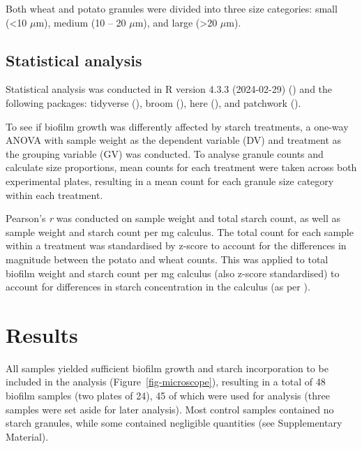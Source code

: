 \documentclass[
  b5paper,
]{book}
\begin{document}
Both wheat and potato granules were divided into three size categories:
small (\textless10 \(\mu\)m), medium (10 -- 20 \(\mu\)m), and large
(\textgreater20 \(\mu\)m).

\subsection{Statistical analysis}\label{statistical-analysis}

Statistical analysis was conducted in R version 4.3.3 (2024-02-29)
() and the following packages:
tidyverse (), broom
(), here
(), and patchwork
().

To see if biofilm growth was differently affected by starch treatments,
a one-way ANOVA with sample weight as the dependent variable (DV) and
treatment as the grouping variable (GV) was conducted. To analyse
granule counts and calculate size proportions, mean counts for each
treatment were taken across both experimental plates, resulting in a
mean count for each granule size category within each treatment.

Pearson's \emph{r} was conducted on sample weight and total starch
count, as well as sample weight and starch count per mg calculus. The
total count for each sample within a treatment was standardised by
z-score to account for the differences in magnitude between the potato
and wheat counts. This was applied to total biofilm weight and starch
count per mg calculus (also z-score standardised) to account for
differences in starch concentration in the calculus (as per
).

\section{Results}\label{results-1}

All samples yielded sufficient biofilm growth and starch incorporation
to be included in the analysis (Figure~\ref{fig-microscope}), resulting
in a total of 48 biofilm samples (two plates of 24), 45 of which were
used for analysis (three samples were set aside for later analysis).
Most control samples contained no starch granules, while some contained
negligible quantities (see Supplementary Material).
\end{document}

